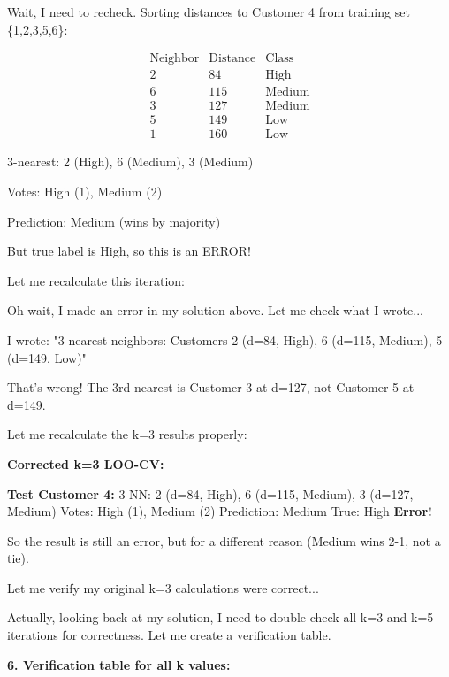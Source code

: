 \documentclass[12pt]{article}
\begin{document}
\begin{computation}
Wait, I need to recheck. Sorting distances to Customer 4 from training set \{1,2,3,5,6\}:

\[
\begin{array}{c|c|c}
\text{Neighbor} & \text{Distance} & \text{Class} \\
\hline
2 & 84 & \text{High} \\
6 & 115 & \text{Medium} \\
3 & 127 & \text{Medium} \\
5 & 149 & \text{Low} \\
1 & 160 & \text{Low}
\end{array}
\]

3-nearest: 2 (High), 6 (Medium), 3 (Medium)

Votes: High (1), Medium (2)

Prediction: Medium (wins by majority)

But true label is High, so this is an ERROR!

Let me recalculate this iteration:

Oh wait, I made an error in my solution above. Let me check what I wrote...

I wrote: "3-nearest neighbors: Customers 2 (d=84, High), 6 (d=115, Medium), 5 (d=149, Low)"

That's wrong! The 3rd nearest is Customer 3 at d=127, not Customer 5 at d=149.

Let me recalculate the k=3 results properly:

\textbf{Corrected k=3 LOO-CV:}

\textbf{Test Customer 4:}
3-NN: 2 (d=84, High), 6 (d=115, Medium), 3 (d=127, Medium)
Votes: High (1), Medium (2)
Prediction: Medium
True: High
\textbf{Error!}

So the result is still an error, but for a different reason (Medium wins 2-1, not a tie).

Let me verify my original k=3 calculations were correct...

Actually, looking back at my solution, I need to double-check all k=3 and k=5 iterations for correctness. Let me create a verification table.

\textbf{6. Verification table for all k values:}


\end{computation}
\end{document}
